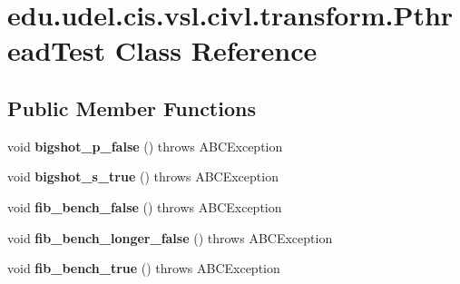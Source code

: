\hypertarget{classedu_1_1udel_1_1cis_1_1vsl_1_1civl_1_1transform_1_1PthreadTest}{}\section{edu.\+udel.\+cis.\+vsl.\+civl.\+transform.\+Pthread\+Test Class Reference}
\label{classedu_1_1udel_1_1cis_1_1vsl_1_1civl_1_1transform_1_1PthreadTest}
\subsection*{Public Member Functions}
\begin{DoxyCompactItemize}
\item 
\hypertarget{classedu_1_1udel_1_1cis_1_1vsl_1_1civl_1_1transform_1_1PthreadTest_a8c36c57a03117f9dc824348742ec5542}{}void {\bfseries bigshot\+\_\+p\+\_\+false} ()  throws A\+B\+C\+Exception \label{classedu_1_1udel_1_1cis_1_1vsl_1_1civl_1_1transform_1_1PthreadTest_a8c36c57a03117f9dc824348742ec5542}

\item 
\hypertarget{classedu_1_1udel_1_1cis_1_1vsl_1_1civl_1_1transform_1_1PthreadTest_ad47f34529489d0eec4e7ba7daddda6d8}{}void {\bfseries bigshot\+\_\+s\+\_\+true} ()  throws A\+B\+C\+Exception \label{classedu_1_1udel_1_1cis_1_1vsl_1_1civl_1_1transform_1_1PthreadTest_ad47f34529489d0eec4e7ba7daddda6d8}

\item 
\hypertarget{classedu_1_1udel_1_1cis_1_1vsl_1_1civl_1_1transform_1_1PthreadTest_ab13e7eb4c604973dddc0a6b7650c3371}{}void {\bfseries fib\+\_\+bench\+\_\+false} ()  throws A\+B\+C\+Exception \label{classedu_1_1udel_1_1cis_1_1vsl_1_1civl_1_1transform_1_1PthreadTest_ab13e7eb4c604973dddc0a6b7650c3371}

\item 
\hypertarget{classedu_1_1udel_1_1cis_1_1vsl_1_1civl_1_1transform_1_1PthreadTest_ae0b4d80412d58a793a9b0b07bd8aef56}{}void {\bfseries fib\+\_\+bench\+\_\+longer\+\_\+false} ()  throws A\+B\+C\+Exception \label{classedu_1_1udel_1_1cis_1_1vsl_1_1civl_1_1transform_1_1PthreadTest_ae0b4d80412d58a793a9b0b07bd8aef56}

\item 
\hypertarget{classedu_1_1udel_1_1cis_1_1vsl_1_1civl_1_1transform_1_1PthreadTest_a5812f715e754b7bbf9df947abacb5d7e}{}void {\bfseries fib\+\_\+bench\+\_\+true} ()  throws A\+B\+C\+Exception \label{classedu_1_1udel_1_1cis_1_1vsl_1_1civl_1_1transform_1_1PthreadTest_a5812f715e754b7bbf9df947abacb5d7e}


\end{DoxyCompactItemize}
